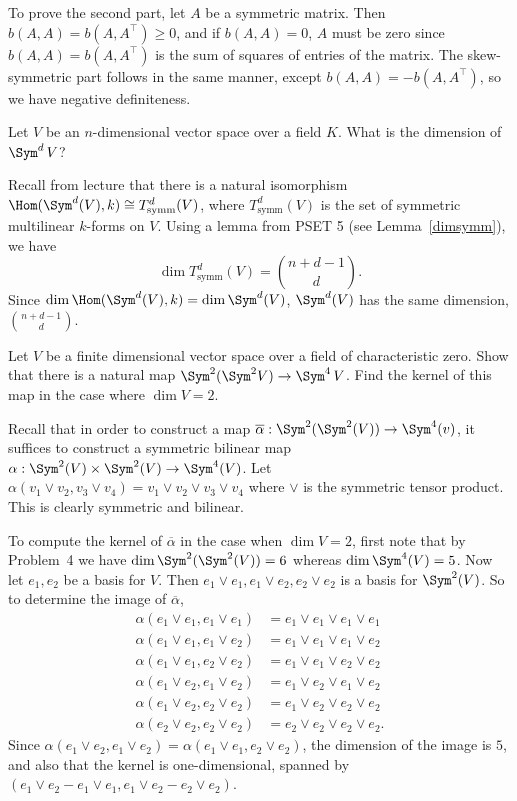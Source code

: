 \documentclass[11pt,letterpaper]{article}
\begin{document}
To prove the second part, let $A$ be a symmetric matrix. Then $b(A,A)=b(A, A^\intercal)\geq 0$, and if $b(A,A)=0$, $A$ must be zero since $b(A,A)=b(A,A^\intercal)$ is the sum of squares of entries of the matrix. The skew-symmetric part follows in the same manner, except $b(A,A)=-b(A, A^\intercal)$, so we have negative definiteness.

\pagebreak
\begin{problem}
  Let $V$ be an $n$-dimensional vector space over a field $K$. What is the dimension of $\Sym^d\,V$?
\end{problem}

Recall from lecture that there is a natural isomorphism $\Hom(\Sym^d(V), k)\cong T_{\mathrm{symm}}^d(V)$, where $T_{\mathrm{symm}}^d(V)$ is the set of symmetric multilinear $k$-forms on $V$. Using a lemma from PSET 5 (see Lemma~\ref{dimsymm}), we have 
\[
  \dim T_{\mathrm{symm}}^d(V) = \binom{n+d-1}{d}
.\] 
Since $\dim \Hom(\Sym^d(V), k) = \dim \Sym^d(V)$, $\Sym^d(V)$ has the same dimension, $\binom{n+d-1}{d}$.

\pagebreak
\begin{problem}
  Let $V$ be a finite dimensional vector space over a field of characteristic zero. Show that there is a natural map $\Sym^2(\Sym^2 V) \to \Sym^4\,V$. Find the kernel of this map in the case where $\dim V = 2$.
\end{problem}

Recall that in order to construct a map $\overline{\alpha} : \Sym^2(\Sym^2(V)) \to \Sym^4(v)$, it suffices to construct a symmetric bilinear map $\alpha : \Sym^2(V)\times \Sym^2(V) \to \Sym^4(V)$. Let $\alpha(v_1\vee v_2,v_3\vee v_4)=v_1\vee v_2\vee v_3 \vee v_4$ where $\vee$ is the symmetric tensor product. This is clearly symmetric and bilinear.

To compute the kernel of $\overline{\alpha}$ in the case when $\dim V = 2$, first note that by Problem~4 we have $\dim \Sym^2(\Sym^2(V))=6$ whereas $\dim \Sym^4(V)=5$. Now let $e_1,e_2$ be a basis for $V$. Then $e_1\vee e_1, e_1\vee e_2, e_2\vee e_2$ is a basis for $\Sym^2(V)$. So to determine the image of $\overline{\alpha}$,
\[
  \begin{aligned}
    \alpha(e_1\vee e_1, e_1\vee e_1) &= e_1\vee e_1 \vee e_1\vee e_1\\  
    \alpha(e_1\vee e_1, e_1\vee e_2) &= e_1\vee e_1 \vee e_1\vee e_2\\  
    \alpha(e_1\vee e_1, e_2\vee e_2) &= e_1\vee e_1 \vee e_2\vee e_2\\  
    \alpha(e_1\vee e_2, e_1\vee e_2) &= e_1\vee e_2 \vee e_1\vee e_2\\  
    \alpha(e_1\vee e_2, e_2\vee e_2) &= e_1\vee e_2 \vee e_2\vee e_2\\  
    \alpha(e_2\vee e_2, e_2\vee e_2) &= e_2\vee e_2 \vee e_2\vee e_2.    
  \end{aligned}
\]
Since $\alpha(e_1\vee e_2, e_1\vee e_2)=\alpha(e_1\vee e_1, e_2\vee e_2)$, the dimension of the image is $5$, and also that the kernel is one-dimensional, spanned by $(e_1\vee e_2-e_1\vee e_1, e_1\vee e_2-e_2\vee e_2)$.   
\end{document}
